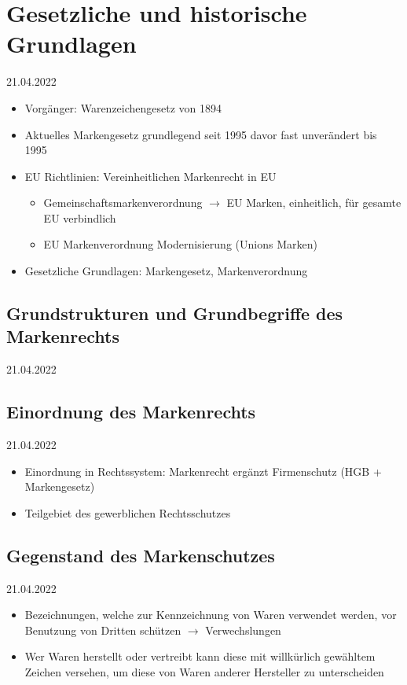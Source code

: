\documentclass{report}
\begin{document}
\section{Gesetzliche und historische Grundlagen}
21.04.2022
\begin{itemize}
	\item Vorgänger: Warenzeichengesetz von 1894
	\item Aktuelles Markengesetz grundlegend seit 1995
	\newline davor fast unverändert bis 1995
	\item EU Richtlinien: Vereinheitlichen Markenrecht in EU
	\begin{itemize}
		\item Gemeinschaftsmarkenverordnung
		\newline $\rightarrow$ EU Marken, einheitlich, für gesamte EU verbindlich
		\item EU Markenverordnung Modernisierung (Unions Marken)
	\end{itemize}
	\item Gesetzliche Grundlagen: Markengesetz, Markenverordnung
\end{itemize}

\subsection{Grundstrukturen und Grundbegriffe des Markenrechts}
21.04.2022

\subsection{Einordnung des Markenrechts}
21.04.2022
\begin{itemize}
	\item Einordnung in Rechtssystem:
	\newline Markenrecht ergänzt Firmenschutz (HGB + Markengesetz)
	\item Teilgebiet des gewerblichen Rechtsschutzes
\end{itemize}

\subsection{Gegenstand des Markenschutzes}
21.04.2022
\begin{itemize}
	\item Bezeichnungen, welche zur Kennzeichnung von Waren verwendet werden, vor Benutzung von Dritten schützen $\rightarrow$ Verwechslungen
	\item Wer Waren herstellt oder vertreibt kann diese mit willkürlich gewähltem Zeichen versehen, um diese von Waren anderer Hersteller zu unterscheiden
\end{itemize}
\end{document}
